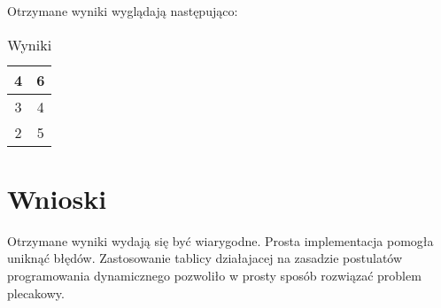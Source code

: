 \documentclass[a4paper,12pt]{article}
\begin{document}
Otrzymane wyniki wyglądają następująco:

\begin{table}[ht] 
\caption{Wyniki} 
\centering 
\begin{tabular}{|c|c|}

\hline
\hline
4 & 6 \\
\hline
3 & 4 \\
\hline
2 & 5 \\
\hline \hline

\end{tabular}
\end{table}
\newpage
\section{Wnioski}

Otrzymane wyniki wydają się być wiarygodne. Prosta implementacja pomogła uniknąć błędów. Zastosowanie tablicy działajacej na zasadzie postulatów programowania dynamicznego pozwoliło w prosty sposób rozwiązać problem plecakowy. 
\end{document}
